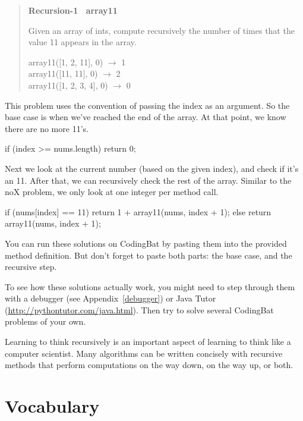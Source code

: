\begin{quote}
\textbf{Recursion-1 ~array11}

Given an array of ints, compute recursively the number of times that the value 11 appears in the array.

\ttfamily
array11([1, 2, 11], 0) $\rightarrow$ 1 \\
array11([11, 11], 0) $\rightarrow$ 2 \\
array11([1, 2, 3, 4], 0) $\rightarrow$ 0
\end{quote}

This problem uses the convention of passing the index as an argument.
So the base case is when we've reached the end of the array.
At that point, we know there are no more 11's.

\begin{code}
if (index >= nums.length) {
    return 0;
}
\end{code}

Next we look at the current number (based on the given index), and check if it's an 11.
After that, we can recursively check the rest of the array.
Similar to the noX problem, we only look at one integer per method call.

\begin{code}
if (nums[index] == 11) {
    return 1 + array11(nums, index + 1);
} else {
    return array11(nums, index + 1);
}
\end{code}

You can run these solutions on CodingBat by pasting them into the provided method definition.
But don't forget to paste both parts: the base case, and the recursive step.


To see how these solutions actually work, you might need to step through them with a debugger (see Appendix~\ref{debugger}) or Java Tutor (\url{http://pythontutor.com/java.html}).
Then try to solve several CodingBat problems of your own.

Learning to think recursively is an important aspect of learning to think like a computer scientist.
Many algorithms can be written concisely with recursive methods that perform computations on the way down, on the way up, or both.


\section{Vocabulary}

